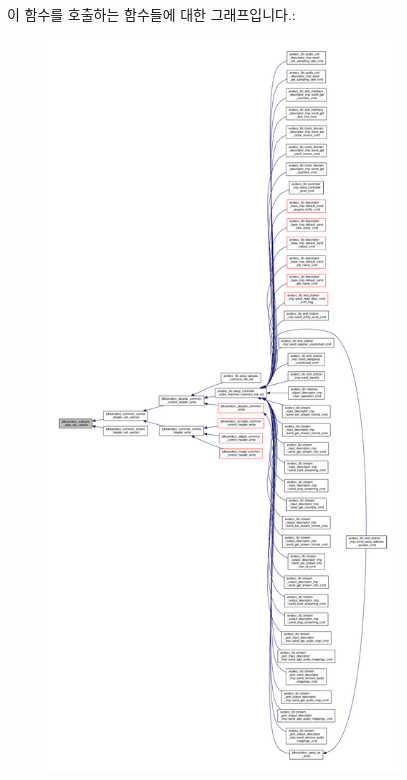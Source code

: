 이 함수를 호출하는 함수들에 대한 그래프입니다.\+:
\nopagebreak
\begin{figure}[H]
\begin{center}
\leavevmode
\includegraphics[height=550pt]{group__jdksavdecc__subtype__data_ga3b2734ddeacb24c5f1e5918b954b44f6_icgraph}
\end{center}
\end{figure}


